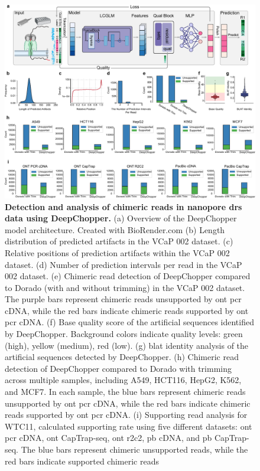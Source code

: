 \documentclass[pdflatex, sn-mathphys-num, lineno]{sn-jnl}%
\theoremstyle{thmstyleone}%
\theoremstyle{thmstyletwo}%
\theoremstyle{thmstylethree}%
\begin{document}
\begin{figure}[!h]
	\includegraphics[height=0.78\columnwidth]{finals/figure1}
	\caption{{\bf  Detection and analysis of chimeric reads in nanopore \gls{drs} data using DeepChopper.} (a) Overview of the DeepChopper model architecture. Created with BioRender.com (b) Length distribution of predicted artifacts in the VCaP 002 dataset. (c)  Relative positions of prediction artifacts within the VCaP 002 dataset. (d) Number of prediction intervals per read in the VCaP 002 dataset. (e) Chimeric read detection of DeepChopper compared to Dorado (with and without trimming) in the VCaP 002 dataset. The purple bars represent chimeric reads unsupported by \gls{ont} \gls{pcr} cDNA, while the red bars indicate chimeric reads supported by \gls{ont} \gls{pcr} cDNA.  (f) Base quality score of the artificial sequences identified by DeepChopper. Background colors indicate quality levels: green (high), yellow (medium), red (low). (g) \gls{blat} identity analysis of the artificial sequences detected by DeepChopper. (h) Chimeric read detection of DeepChopper compared to Dorado with trimming across multiple samples, including A549, HCT116, HepG2, K562, and MCF7. In each sample, the blue bars represent chimeric reads unsupported by \gls{ont} \gls{pcr} cDNA, while the red bars indicate chimeric reads supported by \gls{ont} \gls{pcr} cDNA. (i)  Supporting read analysis for WTC11, calculated supporting rate using five different datasets: \gls{ont} \gls{pcr} cDNA, \gls{ont} CapTrap-seq, \gls{ont} \gls{r2c2}, \gls{pb} cDNA, and \gls{pb} CapTrap-seq. The blue bars represent chimeric unsupported reads, while the red bars indicate supported chimeric reads}\label{fig:f1}
\end{figure}
\end{document}
